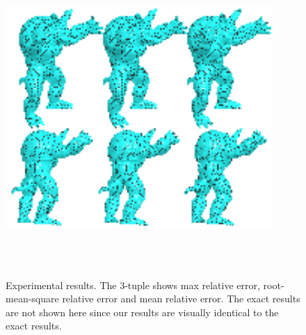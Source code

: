 \begin{figure}[htbp]
\begin{small}
            \\
    
\end{small}
\includegraphics[width=0.9\textwidth]{figs/svg/armadillo_three.png}\\
\begin{small}
                        \\
    \\
\end{small}\vspace{-0.1in}
\caption{Experimental results. The 3-tuple shows max relative error,
root-mean-square relative error and mean relative error. The exact
results are not shown here since our results are visually identical
to the exact results. } \label{fig:results}
\end{figure}

